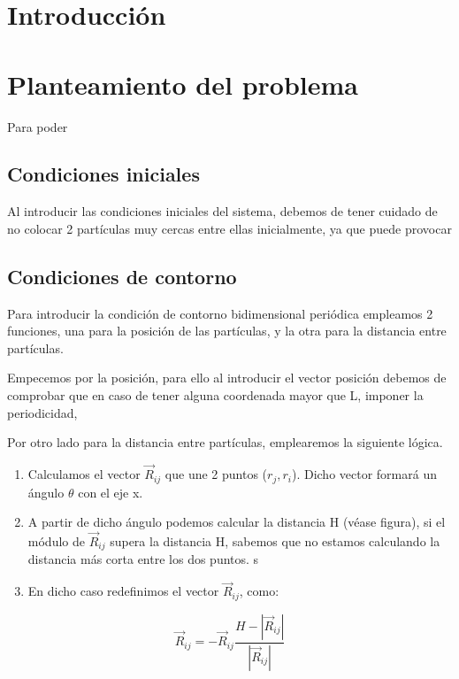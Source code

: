 \documentclass[11pt, twoside]{article} %
\begin{document}
\pagestyle{main}

\section{Introducción}

\section{Planteamiento del problema}

Para poder 

\subsection{Condiciones iniciales}
Al introducir las condiciones iniciales del sistema, debemos de tener cuidado de
no colocar 2 partículas muy cercas entre ellas inicialmente, ya que puede provocar


\subsection{Condiciones de contorno}

Para introducir la condición de contorno bidimensional periódica empleamos 
2 funciones, una para la posición de las partículas, y la otra para la 
distancia entre partículas.

Empecemos por la posición, para ello al introducir el vector posición 
debemos de comprobar que en caso de tener alguna coordenada mayor que L,
imponer la periodicidad, 


\vspace{3mm}

Por otro lado para la distancia entre partículas, emplearemos la siguiente
lógica.
\begin{enumerate}
    \item Calculamos el vector $\vec{R}_{ij}$ que une 2 puntos ($r_j, r_i$).
         Dicho vector formará un ángulo $\theta$ con el eje x.
    \item A partir de dicho ángulo podemos calcular la distancia H (véase
        figura), si el módulo de $\vec{R}_{ij}$ supera la distancia H, sabemos 
        que no estamos calculando la distancia más corta entre los dos 
        puntos.
s    \item En dicho caso redefinimos el vector $\vec{R}_{ij}$, como:
\end{enumerate}

\begin{equation}
    \vec{R}_{ij} = - \vec{R}_{ij} \frac{H-|\vec{R}_{ij}|}{|\vec{R}_{ij}|}
    \label{eq:redef_Rij}
\end{equation}
\end{document}

